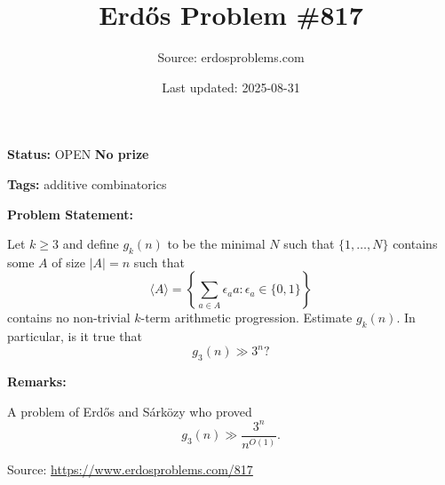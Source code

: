 \documentclass{article}
\title{Erd\H{o}s Problem \#817}
\date{Last updated: 2025-08-31}
\author{Source: erdosproblems.com}
\begin{document}
\maketitle

\noindent\textbf{Status:} OPEN \quad \textbf{No prize}

\noindent\textbf{Tags:} additive combinatorics

\medskip
\noindent\textbf{Problem Statement:}

Let $k\geq 3$ and define $g_k(n)$ to be the minimal $N$ such that $\{1,\ldots,N\}$ contains some $A$ of size $\lvert A\rvert=n$ such that\[\langle A\rangle = \left\{\sum_{a\in A}\epsilon_aa: \epsilon_a\in \{0,1\}\right\}\]contains no non-trivial $k$-term arithmetic progression. Estimate $g_k(n)$. In particular, is it true that\[g_3(n) \gg 3^n?\]

\bigskip
\noindent\textbf{Remarks:}

A problem of Erd\H{o}s and S\'{a}rk\"{o}zy who proved\[g_3(n) \gg \frac{3^n}{n^{O(1)}}.\]

\bigskip
\noindent\small{Source: \url{https://www.erdosproblems.com/817}}
\end{document}
